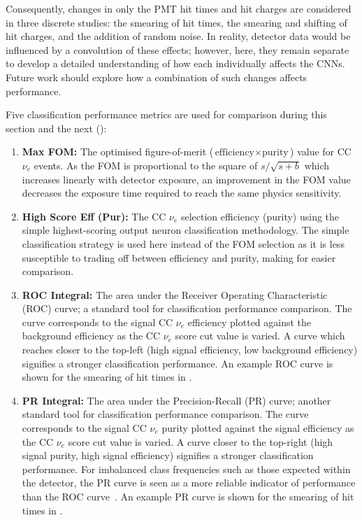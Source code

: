 Consequently, changes in only the PMT hit times and hit charges are considered in three discrete
studies: the smearing of hit times, the smearing and shifting of hit charges, and the addition of
random noise. In reality, detector data would be influenced by a convolution of these effects;
however, here, they remain separate to develop a detailed understanding of how each individually
affects the CNNs. Future work should explore how a combination of such changes affects
performance.

Five classification performance metrics are used for comparison during this section and the next
():
\begin{enumerate}
    \item \textbf{Max FOM:} The optimised figure-of-merit ($\text{efficiency}\times\text{purity}$)
          value for CC $\nu_{e}$ events. As the FOM is proportional to the square of
          $s/\sqrt{s+b}$ which increases linearly with detector exposure, an improvement in the
          FOM value decreases the exposure time required to reach the same physics sensitivity.
    \item \textbf{High Score Eff (Pur):} The CC $\nu_{e}$ selection efficiency (purity) using the
          simple highest-scoring output neuron classification methodology. The simple
          classification strategy is used here instead of the FOM selection as it is less
          susceptible to trading off between efficiency and purity, making for easier comparison.
    \item \textbf{ROC Integral:} The area under the Receiver Operating Characteristic (ROC) curve;
          a standard tool for classification performance comparison. The curve corresponds to the
          signal CC $\nu_{e}$ efficiency plotted against the background efficiency as the CC
          $\nu_{e}$ score cut value is varied. A curve which reaches closer to the top-left (high
          signal efficiency, low background efficiency) signifies a stronger classification
          performance. An example ROC curve is shown for the smearing of hit times in
          .
    \item \textbf{PR Integral:} The area under the Precision-Recall (PR) curve; another standard
          tool for classification performance comparison. The curve corresponds to the signal CC
          $\nu_{e}$ purity plotted against the signal efficiency as the CC $\nu_{e}$ score cut
          value is varied. A curve closer to the top-right (high signal purity, high signal
          efficiency) signifies a stronger classification performance. For imbalanced class
          frequencies such as those expected within the \chipsfive detector, the PR curve is seen
          as a more reliable indicator of performance than the ROC curve~\cite{saito2015}. An
          example PR curve is shown for the smearing of hit times in
          .
\end{enumerate}

